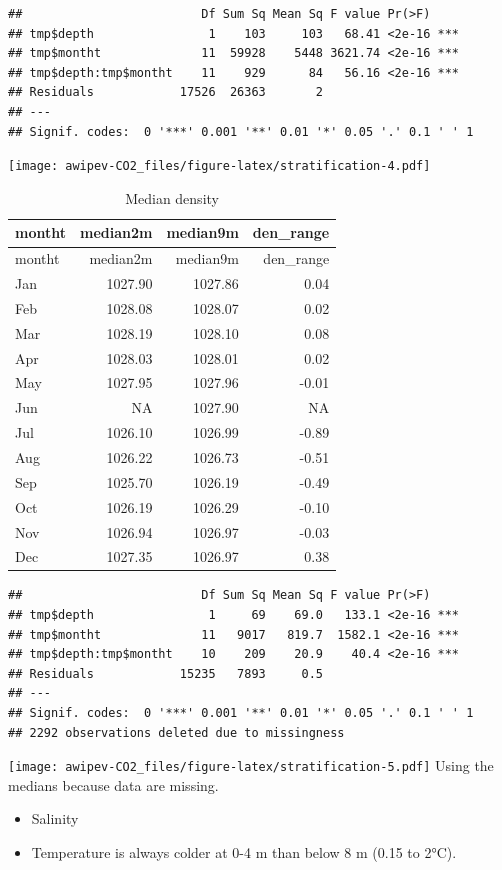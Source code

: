 \documentclass[
]{article}
\providecommand{\tightlist}{%
  \setlength{\itemsep}{0pt}\setlength{\parskip}{0pt}}
\begin{document}
\begin{verbatim}
##                         Df Sum Sq Mean Sq F value Pr(>F)    
## tmp$depth                1    103     103   68.41 <2e-16 ***
## tmp$montht              11  59928    5448 3621.74 <2e-16 ***
## tmp$depth:tmp$montht    11    929      84   56.16 <2e-16 ***
## Residuals            17526  26363       2                   
## ---
## Signif. codes:  0 '***' 0.001 '**' 0.01 '*' 0.05 '.' 0.1 ' ' 1
\end{verbatim}

\texttt{[image: awipev-CO2\_files/figure-latex/stratification-4.pdf]}

\begin{longtable}[]{@{}lrrr@{}}
\caption{Median density}\tabularnewline
\toprule
montht & median2m & median9m & den\_range\tabularnewline
\midrule
\endfirsthead
\toprule
montht & median2m & median9m & den\_range\tabularnewline
\midrule
\endhead
Jan & 1027.90 & 1027.86 & 0.04\tabularnewline
Feb & 1028.08 & 1028.07 & 0.02\tabularnewline
Mar & 1028.19 & 1028.10 & 0.08\tabularnewline
Apr & 1028.03 & 1028.01 & 0.02\tabularnewline
May & 1027.95 & 1027.96 & -0.01\tabularnewline
Jun & NA & 1027.90 & NA\tabularnewline
Jul & 1026.10 & 1026.99 & -0.89\tabularnewline
Aug & 1026.22 & 1026.73 & -0.51\tabularnewline
Sep & 1025.70 & 1026.19 & -0.49\tabularnewline
Oct & 1026.19 & 1026.29 & -0.10\tabularnewline
Nov & 1026.94 & 1026.97 & -0.03\tabularnewline
Dec & 1027.35 & 1026.97 & 0.38\tabularnewline
\bottomrule
\end{longtable}

\begin{verbatim}
##                         Df Sum Sq Mean Sq F value Pr(>F)    
## tmp$depth                1     69    69.0   133.1 <2e-16 ***
## tmp$montht              11   9017   819.7  1582.1 <2e-16 ***
## tmp$depth:tmp$montht    10    209    20.9    40.4 <2e-16 ***
## Residuals            15235   7893     0.5                   
## ---
## Signif. codes:  0 '***' 0.001 '**' 0.01 '*' 0.05 '.' 0.1 ' ' 1
## 2292 observations deleted due to missingness
\end{verbatim}

\texttt{[image: awipev-CO2\_files/figure-latex/stratification-5.pdf]}
Using the medians because data are missing.

\begin{itemize}
\tightlist
\item
  Salinity
\item
  Temperature is always colder at 0-4 m than below 8 m (0.15 to 2°C).
\end{itemize}
\end{document}
